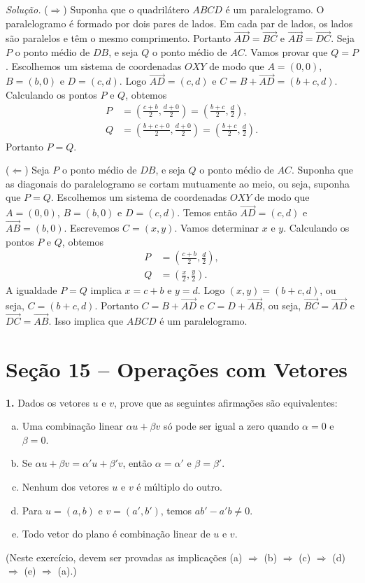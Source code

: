 \documentclass[a4paper,11pt]{article}
\begin{document}
\emph{Solução.}
($\Rightarrow$)
Suponha que o quadrilátero $ABCD$ é um paralelogramo.
O paralelogramo é formado por dois pares de lados.
Em cada par de lados, os lados são paralelos e têm o mesmo comprimento.
Portanto $\overrightarrow{AD} = \overrightarrow{BC}$ e $\overrightarrow{AB} = \overrightarrow{DC}$.
Seja $P$ o ponto médio de $DB$, e seja $Q$ o ponto médio de $AC$.
Vamos provar que $Q = P$.
Escolhemos um sistema de coordenadas $OXY$ de modo que $A = (0,0)$, $B = (b,0)$ e $D = (c, d)$.
Logo $\overrightarrow{AD} = (c,d)$ e $C = B + \overrightarrow{AD} = (b + c, d)$.
Calculando os pontos $P$ e $Q$, obtemos
\begin{align*}
  P & = \left( \frac{c+b}{2}, \frac{d+0}{2} \right) = \left( \frac{b+c}{2}, \frac{d}{2} \right), \\
  Q & = \left( \frac{b + c + 0}{2}, \frac{d+0}{2} \right) = \left( \frac{b+c}{2}, \frac{d}{2} \right).
\end{align*}
Portanto $P = Q$.

($\Leftarrow$)
Seja $P$ o ponto médio de $DB$, e seja $Q$ o ponto médio de $AC$.
Suponha que as diagonais do paralelogramo se cortam mutuamente ao meio, ou seja, suponha que $P = Q$.
Escolhemos um sistema de coordenadas $OXY$ de modo que $A = (0,0)$, $B = (b,0)$ e $D = (c, d)$.
Temos então $\overrightarrow{AD} = (c,d)$ e $\overrightarrow{AB} = (b,0)$.
Escrevemos $C = (x,y)$.
Vamos determinar $x$ e $y$.
Calculando os pontos $P$ e $Q$, obtemos
\begin{align*}
  P & = \left( \frac{c+b}{2}, \frac{d}{2} \right), \\
  Q & = \left( \frac{x}{2}, \frac{y}{2} \right).
\end{align*}
A igualdade $P = Q$ implica $x = c + b$ e $y = d$.
Logo $(x,y) = (b + c, d)$, ou seja, $C = (b + c, d)$.
Portanto $C = B + \overrightarrow{AD}$ e $C = D + \overrightarrow{AB}$, ou seja, $\overrightarrow{BC} = \overrightarrow{AD}$ e $\overrightarrow{DC} = \overrightarrow{AB}$.
Isso implica que $ABCD$ é um paralelogramo.

\section*{Seção 15 -- Operações com Vetores}

\textbf{1.}
Dados os vetores $u$ e $v$, prove que as seguintes afirmações são equivalentes:
\begin{enumerate}[(a)]
  \item
    Uma combinação linear $\alpha u + \beta v$ só pode ser igual a zero quando $\alpha = 0$ e $\beta = 0$.
  \item
    Se $\alpha u + \beta v = \alpha' u + \beta' v$, então $\alpha = \alpha'$ e $\beta = \beta'$.
  \item
    Nenhum dos vetores $u$ e $v$ é múltiplo do outro.
  \item
    Para $u = (a, b)$ e $v = (a', b')$, temos $a b' - a' b \neq 0$.
  \item
    Todo vetor do plano é combinação linear de $u$ e $v$.
\end{enumerate}
(Neste exercício, devem ser provadas as implicações (a) $\Rightarrow$ (b) $\Rightarrow$ (c) $\Rightarrow$ (d) $\Rightarrow$ (e) $\Rightarrow$ (a).)
\end{document}
